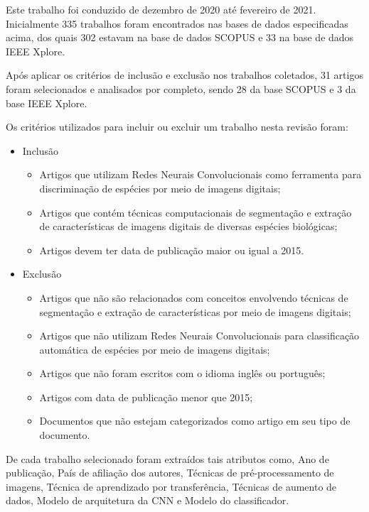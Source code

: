 \documentclass[
	12pt,				%
	oneside,			%
	a4paper,			%
	english,			%
	brazil				%
	]{abntex2ppgsi}
\begin{document}
Este trabalho foi conduzido de dezembro de 2020 até fevereiro de 2021. Inicialmente 335 trabalhos foram encontrados nas bases de dados especificadas acima, dos quais 302 estavam na base de dados SCOPUS e 33 na base de dados IEEE Xplore.

Após aplicar os critérios de inclusão e exclusão nos trabalhos coletados, 31 artigos foram selecionados e analisados por completo, sendo 28 da base SCOPUS e 3 da base IEEE Xplore.

Os critérios utilizados para incluir ou excluir um trabalho nesta revisão foram:

\begin{itemize}
  \item Inclusão
    \begin{itemize}
        \item{Artigos que utilizam Redes Neurais Convolucionais como ferramenta para discriminação de espécies por meio de imagens digitais;}
        \item{Artigos que contém técnicas computacionais de segmentação e extração de características de imagens digitais de diversas espécies biológicas;}
        \item{Artigos devem ter data de publicação maior ou igual a 2015.}
    \end{itemize}
  \item Exclusão
    \begin{itemize}
        \item{Artigos que não são relacionados com conceitos envolvendo técnicas de segmentação e extração de características por meio de imagens digitais;}
        \item{Artigos que não utilizam Redes Neurais Convolucionais para classificação automática de espécies por meio de imagens digitais;}
        \item{Artigos que não foram escritos com o idioma inglês ou português;}
        \item{Artigos com data de publicação menor que 2015;}
        \item{Documentos que não estejam categorizados como artigo em seu tipo de documento.}
    \end{itemize}
\end{itemize}

De cada trabalho selecionado foram extraídos tais atributos como, Ano de publicação, País de afiliação dos autores, Técnicas de pré-processamento de imagens, Técnica de aprendizado por transferência, Técnicas de aumento de dados, Modelo de arquitetura da CNN e Modelo do classificador.
\end{document}
